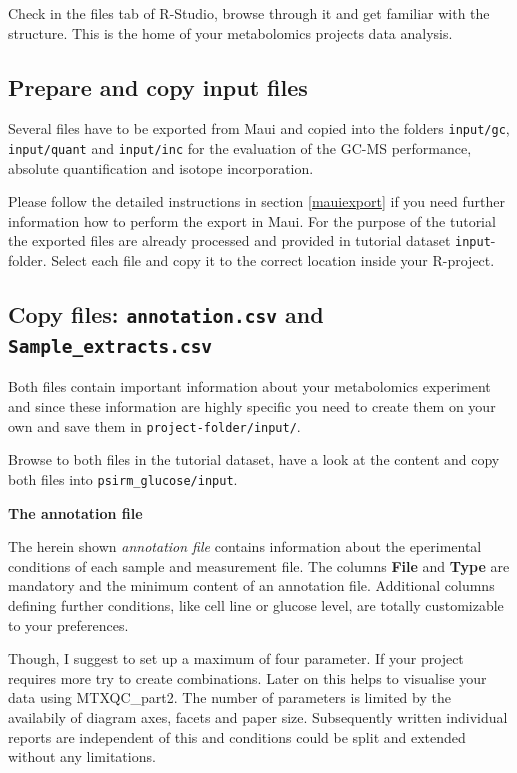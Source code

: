 \documentclass[]{book}
\theoremstyle{definition}
\theoremstyle{definition}
\theoremstyle{definition}
\theoremstyle{remark}
\begin{document}
Check in the files tab of R-Studio, browse through it and get familiar
with the structure. This is the home of your metabolomics projects data
analysis.

\subsection{Prepare and copy input
files}\label{prepare-and-copy-input-files}

Several files have to be exported from Maui and copied into the folders
\texttt{input/gc}, \texttt{input/quant} and \texttt{input/inc} for the
evaluation of the GC-MS performance, absolute quantification and isotope
incorporation.

Please follow the detailed instructions in section \ref{mauiexport} if
you need further information how to perform the export in Maui. For the
purpose of the tutorial the exported files are already processed and
provided in tutorial dataset \texttt{input}-folder. Select each file and
copy it to the correct location inside your R-project.

\subsection{\texorpdfstring{Copy files: \texttt{annotation.csv} and
\texttt{Sample\_extracts.csv}}{Copy files: annotation.csv and Sample\_extracts.csv}}\label{copy-files-annotation.csv-and-sample_extracts.csv}

Both files contain important information about your metabolomics
experiment and since these information are highly specific you need to
create them on your own and save them in \texttt{project-folder/input/}.

Browse to both files in the tutorial dataset, have a look at the content
and copy both files into \texttt{psirm\_glucose/input}.

\textbf{The annotation file}

The herein shown \emph{annotation file} contains information about the
eperimental conditions of each sample and measurement file. The columns
\textbf{File} and \textbf{Type} are mandatory and the minimum content of
an annotation file. Additional columns defining further conditions, like
cell line or glucose level, are totally customizable to your
preferences.

Though, I suggest to set up a maximum of four parameter. If your project
requires more try to create combinations. Later on this helps to
visualise your data using MTXQC\_part2. The number of parameters is
limited by the availabily of diagram axes, facets and paper size.
Subsequently written individual reports are independent of this and
conditions could be split and extended without any limitations.
\end{document}
